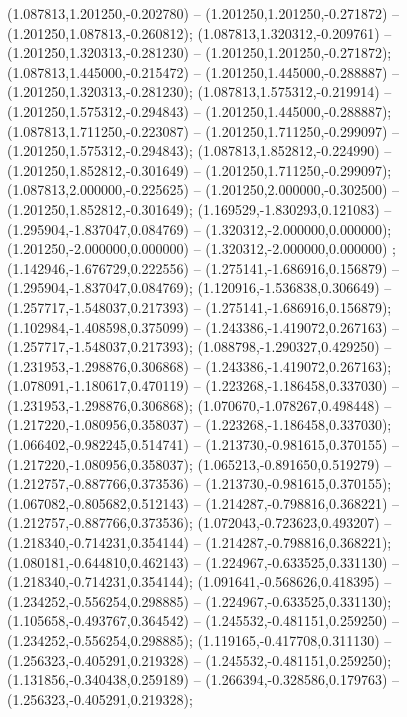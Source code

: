  (1.087813,1.201250,-0.202780) -- (1.201250,1.201250,-0.271872) -- (1.201250,1.087813,-0.260812);
 (1.087813,1.320312,-0.209761) -- (1.201250,1.320313,-0.281230) -- (1.201250,1.201250,-0.271872);
 (1.087813,1.445000,-0.215472) -- (1.201250,1.445000,-0.288887) -- (1.201250,1.320313,-0.281230);
 (1.087813,1.575312,-0.219914) -- (1.201250,1.575312,-0.294843) -- (1.201250,1.445000,-0.288887);
 (1.087813,1.711250,-0.223087) -- (1.201250,1.711250,-0.299097) -- (1.201250,1.575312,-0.294843);
 (1.087813,1.852812,-0.224990) -- (1.201250,1.852812,-0.301649) -- (1.201250,1.711250,-0.299097);
 (1.087813,2.000000,-0.225625) -- (1.201250,2.000000,-0.302500) -- (1.201250,1.852812,-0.301649);
 (1.169529,-1.830293,0.121083) -- (1.295904,-1.837047,0.084769) -- (1.320312,-2.000000,0.000000);
 (1.201250,-2.000000,0.000000) -- (1.320312,-2.000000,0.000000) ;
 (1.142946,-1.676729,0.222556) -- (1.275141,-1.686916,0.156879) -- (1.295904,-1.837047,0.084769);
 (1.120916,-1.536838,0.306649) -- (1.257717,-1.548037,0.217393) -- (1.275141,-1.686916,0.156879);
 (1.102984,-1.408598,0.375099) -- (1.243386,-1.419072,0.267163) -- (1.257717,-1.548037,0.217393);
 (1.088798,-1.290327,0.429250) -- (1.231953,-1.298876,0.306868) -- (1.243386,-1.419072,0.267163);
 (1.078091,-1.180617,0.470119) -- (1.223268,-1.186458,0.337030) -- (1.231953,-1.298876,0.306868);
 (1.070670,-1.078267,0.498448) -- (1.217220,-1.080956,0.358037) -- (1.223268,-1.186458,0.337030);
 (1.066402,-0.982245,0.514741) -- (1.213730,-0.981615,0.370155) -- (1.217220,-1.080956,0.358037);
 (1.065213,-0.891650,0.519279) -- (1.212757,-0.887766,0.373536) -- (1.213730,-0.981615,0.370155);
 (1.067082,-0.805682,0.512143) -- (1.214287,-0.798816,0.368221) -- (1.212757,-0.887766,0.373536);
 (1.072043,-0.723623,0.493207) -- (1.218340,-0.714231,0.354144) -- (1.214287,-0.798816,0.368221);
 (1.080181,-0.644810,0.462143) -- (1.224967,-0.633525,0.331130) -- (1.218340,-0.714231,0.354144);
 (1.091641,-0.568626,0.418395) -- (1.234252,-0.556254,0.298885) -- (1.224967,-0.633525,0.331130);
 (1.105658,-0.493767,0.364542) -- (1.245532,-0.481151,0.259250) -- (1.234252,-0.556254,0.298885);
 (1.119165,-0.417708,0.311130) -- (1.256323,-0.405291,0.219328) -- (1.245532,-0.481151,0.259250);
 (1.131856,-0.340438,0.259189) -- (1.266394,-0.328586,0.179763) -- (1.256323,-0.405291,0.219328);
